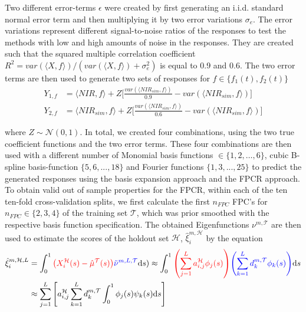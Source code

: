 \documentclass[11pt,twoside,a4paper]{article}
\begin{document}
		 Two different error-terms $\epsilon$ were created by first generating an i.i.d. standard normal error term and then multiplying it by two error variations $\sigma_e $. The error variations represent different signal-to-noise ratios of the responses to test the methods with low and high amounts of noise in the responses. They are created such that the squared multiple correlation coefficient $R^2 = var(\langle X, f\rangle) / (var(\langle X, f\rangle) + \sigma^2_{e})$ is equal to 0.9 and 0.6. The two error terms are then used to generate two sets of responses for $f \in \{f_1(t), f_2(t)\}$	
		\begin{equation}
			\begin{split}
				Y_{1,f} & = \langle NIR, f\rangle + Z  \biggl\lbrack\frac{var(\langle NIR_{sim}, f\rangle)}{0.9} - var(\langle NIR_{sim}, f\rangle)\biggr\rbrack \\
				Y_{2,f} & = \langle NIR_{sim}, f\rangle + Z  \biggl\lbrack\frac{var(\langle NIR_{sim}, f\rangle)}{0.6} - var(\langle NIR_{sim}, f\rangle)\biggr\rbrack
			\end{split}
		\end{equation}
		
		where $Z \sim \mathcal{N}(0,1)$. In total, we created four combinations, using the two true coefficient functions and the two error terms. These four combinations are then used with a different number of Monomial basis functions $ \in \{1,2, \dots, 6\}$, cubic B-spline basis-function $\{5,6,...,18\}$ and Fourier functions $\{1,3,...,25\}$ to predict the generated responses using the basis expansion approach and the FPCR approach.
		To obtain valid out of sample properties for the FPCR, within each of the ten ten-fold cross-validation splits, we first calculate the first $n_{FPC}$ FPC's for $n_{FPC} \in \{2,3,4\}$ of the training set $\mathcal{T}$, which was prior smoothed with the respective basis function specification. The obtained Eigenfunctions $\nu^{m,\mathcal{T}}$ are then used to estimate the scores of the holdout set $\mathcal{H}$, $\hat{\xi}_{i}^{m, \mathcal{H}}$  by the equation
		\begin{equation}
			\begin{split}
				\hat{\xi}_{i}^{m, \mathcal{H},L} & =  \int_{0}^{1} {\color{red} \left(X_{i}^{\mathcal{H}}(s) - \hat{\mu}^{\mathcal{T}}(s)\right)} {\color{blue}\tilde{\nu}^{m, L, \mathcal{T}} }\mathrm{d}s) 
			    \approx \int_{0}^{1} {\color{red}\left(\sum_{j = 1}^{L} a_{i,j}^{\mathcal{H}} \phi_j(s)\right)} {\color{blue}\left(\sum_{k = 1}^{L} d_{k}^{m, \mathcal{T}} \phi_{k}(s)\right)} \mathrm{d}s \\
				 &\approx \sum_{j = 1}^{L} \left[ a_{i,j}^{\mathcal{H}}\sum_{k = 1}^{L}  d_{k}^{m, \mathcal{T}} \int_{0}^{1} \phi_j(s) \psi_{k}(s)\mathrm{d}s\right]
			\end{split}
		\end{equation}
	
\end{document}

